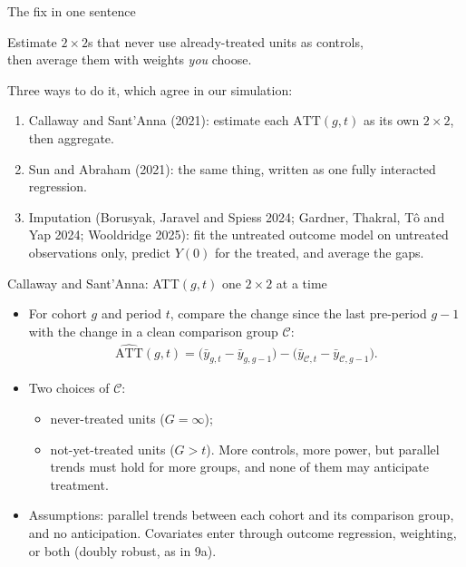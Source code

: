 \documentclass[aspectratio=169,11pt]{beamer}
\begin{document}
\begin{frame}{The fix in one sentence}
\begin{center}
\large
Estimate $2\times2$s that never use already-treated units as controls,\\
then average them with weights \emph{you} choose.
\end{center}
\bigskip
Three ways to do it, which agree in our simulation:
\begin{enumerate}
	\item \alert{Callaway and Sant'Anna (2021)}: estimate each $\text{ATT}(g,t)$ as its own $2\times2$, then aggregate.
	\item \alert{Sun and Abraham (2021)}: the same thing, written as one fully interacted regression.
	\item \alert{Imputation} (Borusyak, Jaravel and Spiess 2024; Gardner, Thakral, T\^o and Yap 2024;
	Wooldridge 2025): fit the untreated outcome model on untreated observations only, predict $Y(0)$ for the treated,
	and average the gaps.
\end{enumerate}
\end{frame}


\begin{frame}{Callaway and Sant'Anna: ATT$(g,t)$ one $2\times2$ at a time}
\begin{itemize}
	\item For cohort $g$ and period $t$, compare the change since the last pre-period $g-1$ with the change in a
	clean comparison group $\mathcal{C}$:
	\begin{align*}
		\widehat{\text{ATT}}(g,t) = \Big(\bar y_{g,t} - \bar y_{g,g-1}\Big) - \Big(\bar y_{\mathcal{C},t} - \bar y_{\mathcal{C},g-1}\Big).
	\end{align*}
	\item Two choices of $\mathcal{C}$:
	\begin{itemize}
		\item \alert{never-treated} units ($G = \infty$);
		\item \alert{not-yet-treated} units ($G > t$). More controls, more power, but parallel trends must hold for more groups,
		and none of them may anticipate treatment.
	\end{itemize}
	\medskip
	\item Assumptions: parallel trends between each cohort and its comparison group, and no anticipation.
	Covariates enter through outcome regression, weighting, or both (doubly robust, as in 9a).
\end{itemize}
\end{frame}
\end{document}
